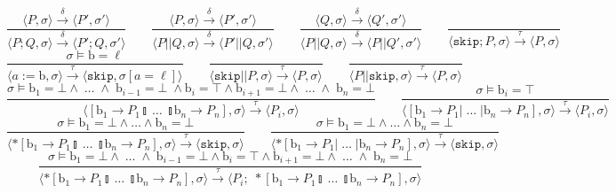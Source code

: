 \documentclass[times, 10pt]{article}
\begin{document}
$$
    \frac{\langle P, \sigma \rangle \xrightarrow{\delta} \langle P', \sigma' \rangle}{\langle P ; Q, \sigma \rangle \xrightarrow{\delta} \langle P' ; Q, \sigma' \rangle} \qquad
    \frac{\langle P, \sigma \rangle \xrightarrow{\delta} \langle P', \sigma' \rangle}{\langle P || Q, \sigma \rangle \xrightarrow{\delta} \langle P' || Q, \sigma' \rangle} \qquad
    \frac{\langle Q, \sigma \rangle \xrightarrow{\delta} \langle Q', \sigma' \rangle}{\langle P || Q, \sigma \rangle \xrightarrow{\delta} \langle P || Q', \sigma' \rangle} \qquad
    \frac{}{\langle \mathtt{skip}; P, \sigma \rangle \xrightarrow{\tau} \langle P, \sigma \rangle} $$$$
    \frac{\sigma \models \mathrm{b} = \ell}{\langle a := \mathrm{b}, \sigma \rangle \xrightarrow{\tau} \langle \mathtt{skip}, \sigma[a = \ell] \rangle} \qquad
    \frac{}{\langle \mathtt{skip} || P, \sigma \rangle \xrightarrow{\tau} \langle P, \sigma \rangle} \qquad
    \frac{}{\langle P || \mathtt{skip}, \sigma \rangle \xrightarrow{\tau} \langle P, \sigma \rangle} $$$$
    \frac{\sigma \models \mathrm{b}_1 = \bot \wedge \; \ldots \; \wedge \; \mathrm{b}_{i-1} = \bot \; \wedge \mathrm{b}_i = \top \wedge \mathrm{b}_{i+1} = \bot \wedge \; \ldots \; \wedge \; \mathrm{b}_n = \bot} {\langle [ \mathrm{b}_1 \rightarrow P_1  \talloblong \; \ldots \; \talloblong \mathrm{b}_n \rightarrow P_n ] , \sigma \rangle \xrightarrow{\tau} \langle P_i , \sigma\rangle  } \qquad
    \frac{\sigma \models \mathrm{b}_i = \top} {\langle [ \mathrm{b}_1 \rightarrow P_1  | \; \ldots \; | \mathrm{b}_n \rightarrow P_n ] , \sigma \rangle \xrightarrow{\tau} \langle P_i , \sigma\rangle  } $$$$
    \frac{\sigma \models \mathrm{b}_1 = \bot \wedge \ldots \wedge \mathrm{b}_n = \bot}{\langle *[ \mathrm{b}_1 \rightarrow P_1  \talloblong \; \ldots \; \talloblong \mathrm{b}_n \rightarrow P_n ] , \sigma \rangle \xrightarrow{\tau} \langle \mathtt{skip} , \sigma\rangle } \qquad
    \frac{\sigma \models \mathrm{b}_1 = \bot \wedge \ldots \wedge \mathrm{b}_n = \bot}{\langle *[ \mathrm{b}_1 \rightarrow P_1  | \; \ldots \; | \mathrm{b}_n \rightarrow P_n ] , \sigma \rangle \xrightarrow{\tau} \langle \mathtt{skip} , \sigma \rangle } $$$$
    \frac{\sigma \models \mathrm{b}_1 = \bot \wedge \; \ldots \; \wedge \; \mathrm{b}_{i-1} = \bot \wedge \mathrm{b}_i = \top \wedge \mathrm{b}_{i+1} = \bot \wedge \; \ldots \; \wedge \; \mathrm{b}_n = \bot} {\langle *[ \mathrm{b}_1 \rightarrow P_1  \talloblong \; \ldots \; \talloblong \mathrm{b}_n \rightarrow P_n ] , \sigma \rangle \xrightarrow{\tau} \langle P_i; \; *[ \mathrm{b}_1 \rightarrow P_1  \talloblong \; \ldots \; \talloblong \mathrm{b}_n \rightarrow P_n ] , \sigma\rangle  } $$$$
$$
\end{document}
